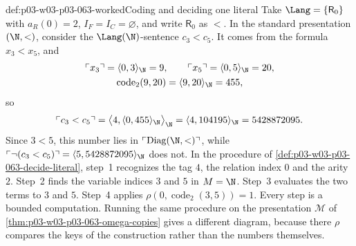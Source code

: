 \begin{hbexample}{def:p03-w03-p03-063-worked}{Coding and deciding one literal}
Take \(\Lang=\{\mathsf R_0\}\) with \(a_R(0)=2\), \(I_F=I_C=\varnothing\),
and write \(\mathsf R_0\) as \(<\).  In the standard presentation
\((\N,<)\), consider the \(\Lang(\N)\)-sentence \(c_3<c_5\).  It comes from
the formula \(x_3<x_5\), and
\begin{gather*}
 \ulcorner x_3\urcorner=\langle0,3\rangle_{\N}=9,\qquad
 \ulcorner x_5\urcorner=\langle0,5\rangle_{\N}=20,\\
 \operatorname{code}_2(9,20)=\langle9,20\rangle_{\N}=455,
\end{gather*}
so
\[
 \ulcorner c_3<c_5\urcorner
 =\bigl\langle4,\langle0,455\rangle_{\N}\bigr\rangle_{\N}
 =\langle4,104195\rangle_{\N}=5428872095 .
\]
Since \(3<5\), this number lies in
\(\ulcorner\operatorname{Diag}(\N,<)\urcorner\), while
\(\ulcorner\neg(c_3<c_5)\urcorner=\langle5,5428872095\rangle_{\N}\) does not.
In the procedure of \cref{def:p03-w03-p03-063-decide-literal}, step~1
recognizes the tag \(4\), the relation index \(0\) and the arity \(2\).
Step~2 finds the variable indices \(3\) and \(5\) in \(M=\N\).  Step~3
evaluates the two terms to \(3\) and \(5\).  Step~4 applies
\(\rho(0,\operatorname{code}_2(3,5))=1\).  Every step is a bounded
computation.  Running the same procedure on the presentation \(\mathcal M\)
of \cref{thm:p03-w03-p03-063-omega-copies} gives a different diagram, because
there \(\rho\) compares the keys of the construction rather than the numbers
themselves.
\end{hbexample}

